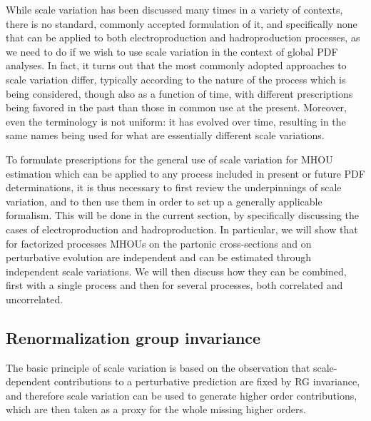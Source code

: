 While scale variation has been discussed many times in a variety of
contexts, there is no standard, commonly accepted formulation of it,
and specifically none that can be applied to both electroproduction
and hadroproduction processes, as we need to do if we wish to use
scale variation in the context of global PDF analyses.
%
In fact, it
turns out that the most commonly adopted approaches to scale variation
differ, typically according to the nature of the process which is
being considered, though also as a function of time, with different
prescriptions being favored in the past than those in common use 
at the present.
%
Moreover, even the terminology is not uniform: it has  evolved over time, 
resulting in the same names being used for what are essentially different 
scale variations.

To formulate prescriptions for the general use of scale
variation for MHOU estimation which can be applied to any process
included in present or future PDF determinations, it is thus necessary
to first review the underpinnings of scale variation, and to then use
them in order to set up a generally applicable formalism.
%
This
will be done in the current section, by specifically discussing the cases of
electroproduction and hadroproduction.
%
In particular, we will show that
for factorized processes MHOUs on  the partonic cross-sections and on
perturbative evolution are independent and can be
estimated through independent scale variations. We will then discuss 
how they can be combined, first with a single process and then for 
several processes, both correlated and uncorrelated. 

\subsection{Renormalization group invariance}
\label{rgi_sec}

The basic principle of scale variation is based
on the observation that scale-dependent
contributions to a perturbative prediction are fixed by
RG invariance, and therefore scale variation can be
used to generate higher order contributions, which are then taken as a
proxy for the whole missing higher orders.

